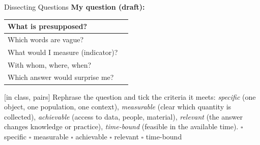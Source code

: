 \begin{uebungsblatt}{Dissecting Questions}
\smallskip
\noindent\textbf{My question (draft):}

\begin{center}
\renewcommand{\arraystretch}{2.0}
\begin{tabular}{|p{}|p{}|}
\hline
What is presupposed? & \\ \hline
Which words are vague? & \\ \hline
What would I measure (indicator)? & \\ \hline
With whom, where, when? & \\ \hline
Which answer would surprise me? & \\ \hline
\end{tabular}
\end{center}

[in class, pairs]
Rephrase the question and tick the criteria it meets: \emph{specific} (one
object, one population, one context), \emph{measurable} (clear which
quantity is collected), \emph{achievable} (access to data, people,
material), \emph{relevant} (the answer changes knowledge or practice),
\emph{time-bound} (feasible in the available time).
\noindent$\square$ specific \quad $\square$ measurable \quad
$\square$ achievable \quad $\square$ relevant \quad $\square$ time-bound
\end{uebungsblatt}

